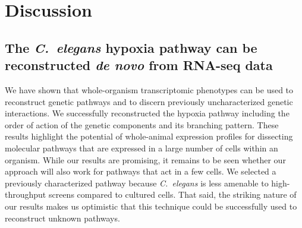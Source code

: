 \documentclass[9pt,twocolumn,twoside]{pnas-new}
\newcommand{\cel}{\emph{C.~elegans}}
\begin{document}
\section*{Discussion}
\label{sec:discussion}
\subsection*{The \cel{} hypoxia pathway can be reconstructed \emph{de novo} from
             RNA-seq data}
We have shown that whole-organism transcriptomic phenotypes can
be used to reconstruct genetic pathways and to discern previously
uncharacterized genetic interactions. We successfully reconstructed the hypoxia
pathway including the order of action of the genetic components and its
branching pattern.
\color{purple}
These results highlight the potential of whole-animal
expression profiles for dissecting molecular pathways that are expressed in a
large number of cells within an organism. While our results are promising, it
remains to be seen whether our approach will also work for pathways that act in
a few cells. We selected a previously characterized pathway because \cel{} is
less amenable to high-throughput screens compared to cultured cells. That said,
the striking nature of our results makes us optimistic that this technique could
be successfully used to reconstruct unknown pathways.
\color{black}
\end{document}
